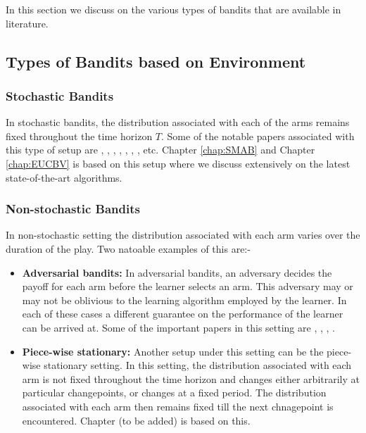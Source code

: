 In this section we discuss on the various types of bandits that are available in literature. 


\subsection{Types of Bandits based on Environment}


\subsubsection{Stochastic Bandits}
In stochastic bandits, the distribution associated with each of the arms remains fixed throughout the time horizon $T$. Some of the notable papers associated with this type of setup are \citet{robbins1952some}, \citet{lai1985asymptotically},  \citet{agrawal1995sample}, \citet{auer2002finite}, \citet{auer2010ucb}, \citet{audibert2009minimax}, \citet{lattimore2015optimally}, etc. Chapter \ref{chap:SMAB} and Chapter \ref{chap:EUCBV} is based on this setup where we discuss extensively on the latest state-of-the-art algorithms.



\subsubsection{Non-stochastic Bandits}

In non-stochastic setting the distribution associated with each arm varies over the duration of the play. Two natoable examples of this are:-

\begin{itemize}
\item \textbf{Adversarial bandits: } In adversarial bandits, an adversary decides the payoff for each arm before the learner selects an arm. This adversary may or may not be oblivious to the learning algorithm employed by the learner. In each of these cases a different guarantee on the performance of the learner can be arrived at. Some of the important papers in this setting are \citet{auer2002nonstochastic}, \citet{auer2002nonstochastic}, \citet{auer2002using}, \citet{kocak2014efficient}.

\item \textbf{Piece-wise stationary:} Another setup under this setting can be the piece-wise stationary setting. In this setting, the distribution associated with each arm is not fixed throughout the time horizon and changes either arbitrarily at particular changepoints, or changes at a fixed period. The distribution associated with each arm then  remains fixed till the next chnagepoint is encountered. Chapter (to be added) is based on this.
\end{itemize}


